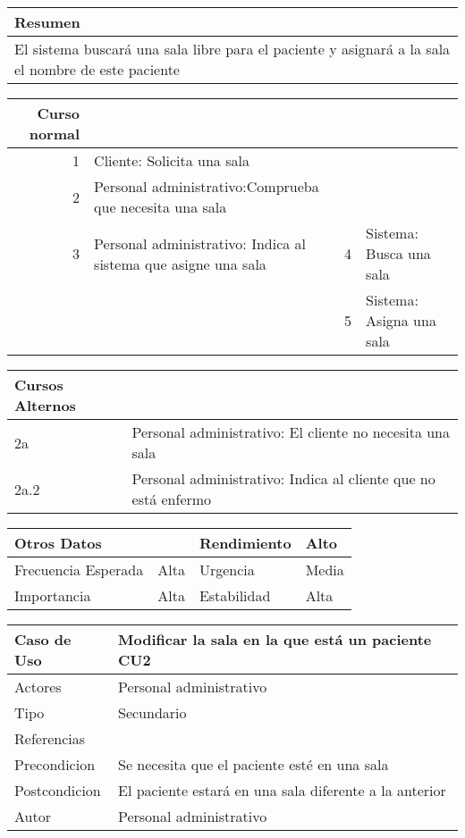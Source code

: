 \documentclass[11pt]{article}
\begin{document}
\begin{center}
\begin{tabular}{l}
\hline
Resumen\\
\hline
El sistema buscará una sala libre para el paciente y asignará a la sala el nombre de este paciente\\
\hline
\end{tabular}
\end{center}

\begin{center}
\begin{tabular}{rlll}
\hline
Curso normal &  &  & \\
\hline
1 & Cliente: Solicita una sala &  & \\
\hline
2 & Personal administrativo:Comprueba que necesita una sala &  & \\
\hline
3 & Personal administrativo: Indica al sistema que asigne una sala & 4 & Sistema: Busca una sala\\
\hline
 &  & 5 & Sistema: Asigna una sala\\
\hline
\end{tabular}
\end{center}


\begin{center}
\begin{tabular}{ll}
\hline
Cursos Alternos & \\
\hline
2a & Personal administrativo: El cliente no necesita una sala\\
\hline
2a.2 & Personal administrativo: Indica al cliente que no está enfermo\\
\hline
\end{tabular}
\end{center}

\begin{center}
\begin{tabular}{llll}
\hline
Otros Datos &  & Rendimiento & Alto\\
\hline
Frecuencia Esperada & Alta & Urgencia & Media\\
\hline
Importancia & Alta & Estabilidad & Alta\\
\hline
\end{tabular}
\end{center}





\begin{center}
\begin{tabular}{ll}
\hline
Caso de Uso & Modificar la sala en la que está un paciente                 \vline CU2\\
\hline
Actores & Personal administrativo\\
\hline
Tipo & Secundario\\
\hline
Referencias & \\
\hline
Precondicion & Se necesita que el paciente esté en una sala\\
\hline
Postcondicion & El paciente estará en una sala diferente a la anterior\\
\hline
Autor & Personal administrativo\\
\hline
\end{tabular}
\end{center}
\end{document}
